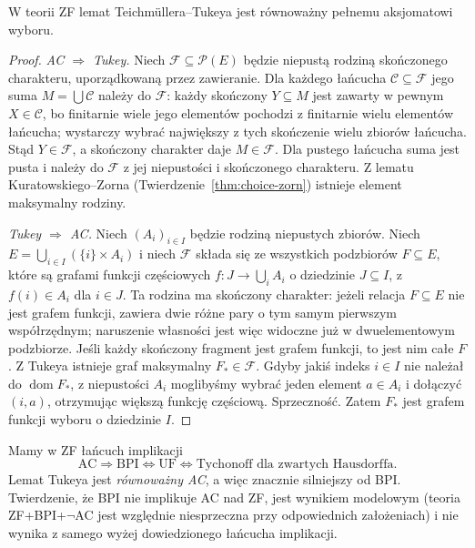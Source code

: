 \begin{twierdzenie}
\label{thm:tukey-equivalent-ac}
W teorii ZF lemat Teichmüllera--Tukeya jest
równoważny pełnemu aksjomatowi wyboru.
\end{twierdzenie}
\begin{proof}
\emph{AC $\Rightarrow$ Tukey.}
Niech $\mathcal F\subseteq\mathcal P(E)$ będzie niepustą
rodziną skończonego charakteru, uporządkowaną przez
zawieranie. Dla każdego łańcucha $\mathcal C\subseteq\mathcal F$
jego suma $M=\bigcup\mathcal C$ należy do $\mathcal F$:
każdy skończony $Y\subseteq M$ jest zawarty w pewnym
$X\in\mathcal C$, bo finitarnie wiele jego elementów
pochodzi z finitarnie wielu elementów łańcucha;
wystarczy wybrać największy z tych skończenie wielu
zbiorów łańcucha. Stąd $Y\in\mathcal F$, a skończony
charakter daje $M\in\mathcal F$. Dla pustego łańcucha
suma jest pusta i należy do $\mathcal F$ z jej niepustości
i skończonego charakteru. Z lematu Kuratowskiego--Zorna
(Twierdzenie~\ref{thm:choice-zorn}) istnieje element
maksymalny rodziny.

\emph{Tukey $\Rightarrow$ AC.}
Niech $(A_i)_{i\in I}$ będzie rodziną niepustych zbiorów.
Niech $E=\bigcup_{i\in I}(\{i\}\times A_i)$ i niech
$\mathcal F$ składa się ze wszystkich podzbiorów $F\subseteq E$,
które są grafami funkcji częściowych $f:J\to\bigcup_iA_i$
o dziedzinie $J\subseteq I$, z $f(i)\in A_i$ dla $i\in J$.
Ta rodzina ma skończony charakter: jeżeli relacja
$F\subseteq E$ nie jest grafem funkcji, zawiera dwie
różne pary o tym samym pierwszym współrzędnym;
naruszenie własności jest więc widoczne już w
dwuelementowym podzbiorze. Jeśli każdy skończony
fragment jest grafem funkcji, to jest nim całe $F$.
Z Tukeya istnieje graf maksymalny $F_\ast\in\mathcal F$.
Gdyby jakiś indeks $i\in I$ nie należał do
$\operatorname{dom}F_\ast$, z niepustości $A_i$ moglibyśmy
wybrać jeden element $a\in A_i$ i dołączyć $(i,a)$,
otrzymując większą funkcję częściową. Sprzeczność.
Zatem $F_\ast$ jest grafem funkcji wyboru o dziedzinie $I$.
\end{proof}

\begin{uwaga}
\label{rem:bpi-vs-ac}
Mamy w ZF łańcuch implikacji
\[
\mathrm{AC}\Longrightarrow \mathrm{BPI}
\Longleftrightarrow\mathrm{UF}
\Longleftrightarrow\text{Tychonoff dla zwartych Hausdorffa}.
\]
Lemat Tukeya jest \emph{równoważny AC}, a więc
znacznie silniejszy od BPI. Twierdzenie, że BPI nie
implikuje AC nad ZF, jest wynikiem modelowym
(teoria ZF+BPI+$\neg$AC jest względnie niesprzeczna
przy odpowiednich założeniach) i nie wynika z samego
wyżej dowiedzionego łańcucha implikacji.
\end{uwaga}

